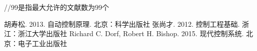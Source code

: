 \newpage

\begin{thebibliography}{99}//99是指最大允许的文献数为99个

 胡寿松. 2013. 自动控制原理. 北京：科学出版社
 张尚才. 2012. 控制工程基础. 浙江：浙江大学出版社
 Richard C. Dorf, Robert H. Bishop. 2015. 现代控制系统. 北京：电子工业出版社

\end{thebibliography}
